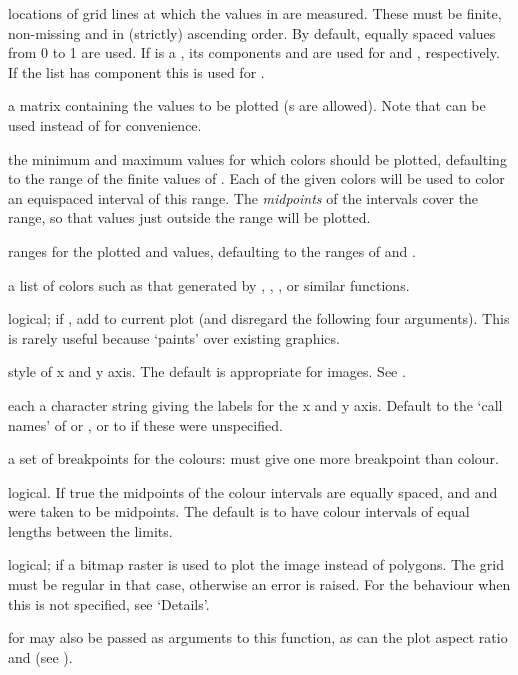 \begin{Arguments}
\begin{ldescription}
\item[\code{x,y}] locations of grid lines at which the values in  are
measured.  These must be finite, non-missing and in (strictly)
ascending order.  By default, equally
spaced values from 0 to 1 are used.  If  is a ,
its components  and  are used for 
and , respectively. If the list has component  this
is used for .
\item[\code{z}] a matrix containing the values to be plotted (s are
allowed).  Note that  can be used instead of  for
convenience.
\item[\code{zlim}] the minimum and maximum  values for which colors
should be plotted, defaulting to the range of the finite values of
. Each of the given colors will be used to color an
equispaced interval of this range. The \emph{midpoints} of the
intervals cover the range, so that values just outside the range
will be plotted.
\item[\code{xlim, ylim}] ranges for the plotted  and  values,
defaulting to the ranges of  and .
\item[\code{col}] a list of colors such as that generated by
, ,
,  or similar
functions.
\item[\code{add}] logical; if , add to current plot (and disregard
the following four arguments).  This is rarely useful because
 `paints' over existing graphics.
\item[\code{xaxs, yaxs}] style of x and y axis.  The default  is
appropriate for images.  See .
\item[\code{xlab, ylab}] each a character string giving the labels for the x and
y axis.  Default to the `call names' of  or , or to
 if these were unspecified.
\item[\code{breaks}] a set of breakpoints for the colours: must give one more
breakpoint than colour.
\item[\code{oldstyle}] logical. If true the midpoints of the colour intervals
are equally spaced, and  and  were taken
to be midpoints.  The default is to have colour intervals of equal
lengths between the limits.
\item[\code{useRaster}] logical; if  a bitmap raster is used to
plot the image instead of polygons. The grid must be regular in that
case, otherwise an error is raised.   For the behaviour when this is
not specified, see `Details'.
\item[\code{...}]  for  may also be
passed as arguments to this function, as can the plot aspect ratio
 and  (see ).
\end{ldescription}
\end{Arguments}
